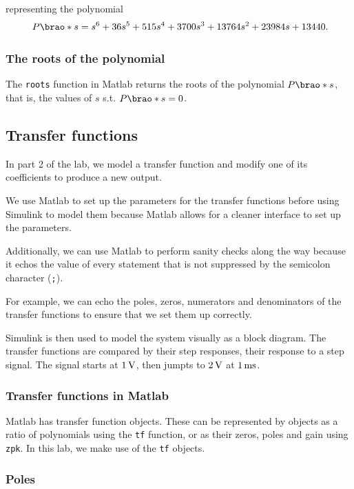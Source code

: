 \documentclass[12pt]{article}
\DeclarePairedDelimiter\brao()%
\begin{document}
representing the polynomial
\[
    P\brao*s = s^6 + 36s^5 + 515s^4 + 3700s^3 + 13764s^2 + 23984s + 13440\rlap.
\]

\subsubsection{The roots of the polynomial}

The \texttt{roots} function in Matlab returns the roots of the polynomial $P\brao*s$, that is, the values of $s$ s.t. $P\brao*s = 0$.

\subsection{Transfer functions}

In part 2 of the lab, we model a transfer function and modify one of its coefficients to produce a new output.

We use Matlab to set up the parameters for the transfer functions before using Simulink to model them because Matlab allows for a cleaner interface to set up the parameters.

Additionally, we can use Matlab to perform sanity checks along the way because it echos the value of every statement that is not suppressed by the semicolon character (\texttt{;}).

For example, we can echo the poles, zeros, numerators and denominators of the transfer functions to ensure that we set them up correctly.

Simulink is then used to model the system visually as a block diagram.
The transfer functions are compared by their step responses, their response to a step signal.
The signal starts at $\SI1\volt$, then jumpts to $\SI2\volt$ at $\SI1{\milli\second}$.

\subsubsection{Transfer functions in Matlab}

Matlab has transfer function objects.
These can be represented by objects as a ratio of polynomials using the \texttt{tf} function,
or as their zeros, poles and gain using \texttt{zpk}.
In this lab, we make use of the \texttt{tf} objects.

\subsubsection{Poles}
\end{document}
